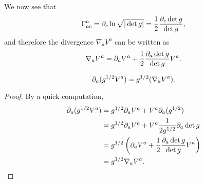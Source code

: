 We now see that
\begin{equation}\label{aacchristoffel}
    \Gamma^a_{ac}=\partial_c \ln \sqrt{|\det g|}=\frac{1}{2} \frac{\partial_c \det g}{\det g},
\end{equation}
and therefore the divergence $\nabla_a V^a$ can be written as
\begin{equation}\label{vectordivergence}
    \nabla_a V^a = \partial_a V^a + \frac{1}{2} \frac{\partial_a \det g}{\det g} V^a.
\end{equation}
\begin{lem}\label{divergencetopartial}
$$\partial_a(g^{1/2} V^a)= g^{1/2}(\nabla_a V^a).$$
\end{lem}
\begin{proof}
By a quick computation,
\begin{align*}
    \partial_a(g^{1/2} V^a)&= g^{1/2} \partial_a V^a + V^a \partial_a (g^{1/2})\\
    &= g^{1/2} \partial_a V^a + V^a \frac{1}{2 g^{1/2}} \partial_a \det g\\
    &= g^{1/2} \left(\partial_a V^a + \frac{1}{2} \frac{\partial_a \det g}{\det g} V^a\right)\\
    &= g^{1/2} \nabla_a V^a.\qedhere
\end{align*}
\end{proof}


